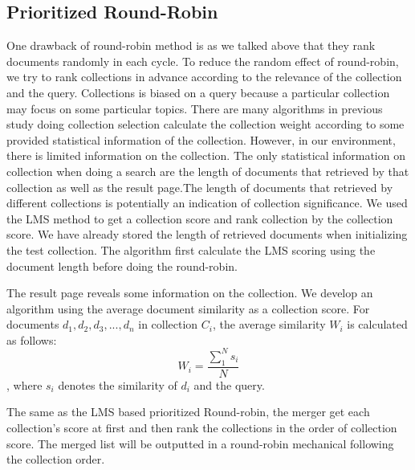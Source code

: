 \subsection{Prioritized Round-Robin}
One drawback of round-robin method is as we talked above that they rank documents randomly in each cycle. To reduce the random effect of round-robin, we try to rank collections in advance according to the relevance of the collection and the query. Collections is biased on a query because a particular collection may focus on some particular topics. There are many algorithms in previous study doing collection selection calculate the collection weight according to some provided statistical information of the collection. However, in our environment, there is limited information on the collection. The only statistical information on collection when doing a search are the length of documents that retrieved by that collection as well as the result page.The length of documents that retrieved by different collections is potentially an indication of collection significance. We used the LMS method to get a collection score and rank collection by the collection score. We have already stored the length of retrieved documents when initializing the test collection. The algorithm first calculate the LMS scoring using the document length before doing the round-robin.

The result page reveals some information on the collection. We develop an algorithm using the average document similarity as a collection score. For documents ${d_1, d_2, d_3,...,d_n}$ in collection ${C_i}$, the average similarity $W_i$ is calculated as follows:
\begin{equation}
\label{eq:average similarity}
W_i=\frac{\sum\limits_1^N s_i}{N}
\end{equation}
, where $s_i$ denotes the similarity of $d_i$ and the query.

The same as the LMS based prioritized Round-robin, the merger get each collection's score at first and then rank the collections in the order of collection score. The merged list will be outputted in a round-robin mechanical following the collection order.

